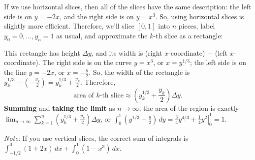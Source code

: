 \documentclass[main]{subfiles}
\begin{document}
\begin{enumerate}
\begin{solution}
    If we use horizontal slices, then all of the slices have the same
    description: the left side is on $y = -2x$, and the right side is on
    $y = x^3$.  So, using horizontal slices is slightly more efficient.
    Therefore, we'll slice $[0, 1]$ into $n$ pieces, label $y_0 = 0,
    \ldots, y_n = 1$ as usual, and approximate the $k$-th slice as a
    rectangle:
    \begin{center}
    \end{center}
    This rectangle has height $\Delta y$, and its width is (right
    $x$-coordinate) $-$ (left $x$-coordinate).  The right side is on the
    curve $y = x^3$, or $x = y^{1/3}$; the left side is on the line $y =
    -2x$, or $x = - \frac{y}{2}$.  So, the width of the rectangle is
    $y_k^{1/3} - \left( - \frac{y_k}{2} \right) = y_k^{1/3} +
    \frac{y_k}{2}$.  Therefore,
    \[ \text{area of $k$-th slice} \approx \left(y_k^{1/3} + \frac{y_k}{2}
    \right) \Delta y.\] \textbf{Summing} and \textbf{taking the limit} as
    $n \to \infty$, the area of the region is exactly $\displaystyle
    \lim_{n \to \infty} \sum_{k=1}^n \left( y_k^{1/3} + \frac{y_k}{2}
    \right) \Delta y$, or $\displaystyle \int_0^1 \left( y^{1/3} +
      \frac{y}{2} \right)\,dy = \left. \frac{3}{4} y^{4/3} + \frac{1}{4}
      y^2 \right|_0^1 = \boxed{1}$.

    \textit{Note:} If you use vertical slices, the correct sum of
    integrals is $\displaystyle \int_{-1/2}^0 (1 + 2x)\,dx + \int_0^1 (1 -
    x^3)\,dx$.
  \end{solution}


\end{enumerate}
\end{document}
